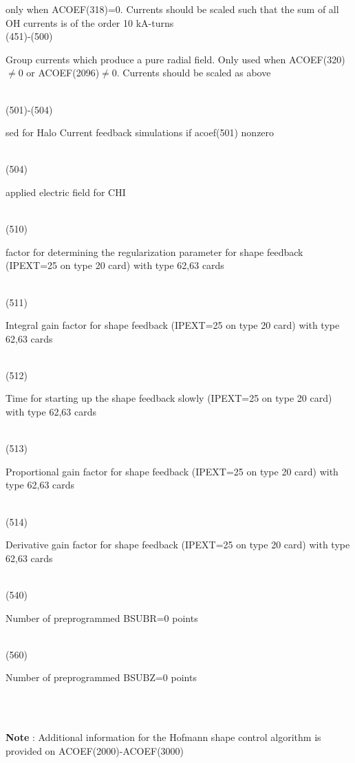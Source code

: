 \begin{tabbing}
{only when ACOEF(318)=0. Currents should be scaled such that the sum of all OH currents is
of the order 10 kA-turns}\\
(451)-(500) \> \> \parbox[t]{\width}{Group currents which produce a pure radial field.  Only
used when ACOEF(320)$\ne$0 or ACOEF(2096)$\ne$0.  Currents should be scaled as above}\\
(501)-(504) \> \> \parbox[t]{\width}{sed for Halo Current feedback simulations if acoef(501) nonzero}\\
(504) \> \> \parbox[t]{\width}{applied electric field for CHI} \\
(510) \> \> \parbox[t]{\width}{factor for determining the regularization parameter for shape feedback
(IPEXT=25 on type 20 card) with type 62,63 cards}\\
(511) \> \> \parbox[t]{\width}{Integral gain factor for shape feedback
(IPEXT=25 on type 20 card) with type 62,63 cards}\\
(512) \> \> \parbox[t]{\width}{Time for starting up the shape feedback slowly
(IPEXT=25 on type 20 card) with type 62,63 cards}\\
(513) \> \> \parbox[t]{\width}{Proportional gain factor for shape feedback
(IPEXT=25 on type 20 card) with type 62,63 cards}\\
(514) \> \> \parbox[t]{\width}{Derivative gain factor for shape feedback
(IPEXT=25 on type 20 card) with type 62,63 cards}\\
(540) \> \> \parbox[t]{\width}{Number of preprogrammed BSUBR=0 points}\\ 
(560) \> \>\parbox[t]{\width}{Number of preprogrammed BSUBZ=0 points} \\
 \\
\parbox[t]{\textwidth}{{\bf Note} : Additional information for the Hofmann shape control
algorithm is provided on ACOEF(2000)-ACOEF(3000)}
\end{tabbing}
